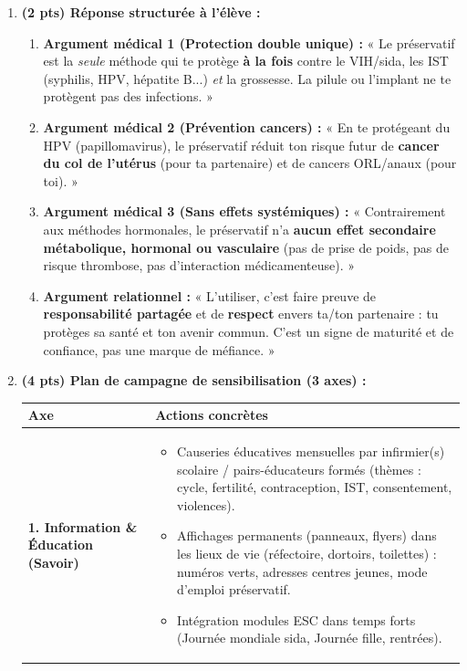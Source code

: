 \documentclass[11pt]{article}
\begin{document}
\begin{corrige}
\begin{enumerate}[itemsep=6pt]
\begin{itemize}
\end{itemize}
\item \textbf{(2 pts) Réponse structurée à l'élève :}
\begin{enumerate}
\item \textbf{Argument médical 1 (Protection double unique) :} « Le préservatif est la \emph{seule} méthode qui te protège \textbf{à la fois} contre le VIH/sida, les IST (syphilis, HPV, hépatite B...) \emph{et} la grossesse. La pilule ou l'implant ne te protègent pas des infections. »
\item \textbf{Argument médical 2 (Prévention cancers) :} « En te protégeant du HPV (papillomavirus), le préservatif réduit ton risque futur de \textbf{cancer du col de l'utérus} (pour ta partenaire) et de cancers ORL/anaux (pour toi). »
\item \textbf{Argument médical 3 (Sans effets systémiques) :} « Contrairement aux méthodes hormonales, le préservatif n'a \textbf{aucun effet secondaire métabolique, hormonal ou vasculaire} (pas de prise de poids, pas de risque thrombose, pas d'interaction médicamenteuse). »
\item \textbf{Argument relationnel :} « L'utiliser, c'est faire preuve de \textbf{responsabilité partagée} et de \textbf{respect} envers ta/ton partenaire : tu protèges sa santé et ton avenir commun. C'est un signe de maturité et de confiance, pas une marque de méfiance. »
\end{enumerate}
\item \textbf{(4 pts) Plan de campagne de sensibilisation (3 axes) :}
\begin{center}
\begin{tabularx}{\linewidth}{|l|X|}\hline
\rowcolor{popblueL} \textbf{Axe} & \textbf{Actions concrètes} \\ \hline
\textbf{1. Information \& Éducation (Savoir)} & \begin{itemize}\item Causeries éducatives mensuelles par infirmier(s) scolaire / pairs-éducateurs formés (thèmes : cycle, fertilité, contraception, IST, consentement, violences). \item Affichages permanents (panneaux, flyers) dans les lieux de vie (réfectoire, dortoirs, toilettes) : numéros verts, adresses centres jeunes, mode d'emploi préservatif. \item Intégration modules ESC dans temps forts (Journée mondiale sida, Journée fille, rentrées). \end{itemize} \\ \hline

\end{tabularx}
\end{center}
\end{enumerate}
\end{corrige}
\end{document}
